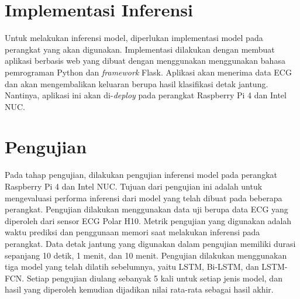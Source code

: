 \section{Implementasi Inferensi}
\label{subsec: metodologi-implementasi}

Untuk melakukan inferensi model, diperlukan implementasi model pada perangkat yang akan digunakan.
Implementasi dilakukan dengan membuat aplikasi berbasis web yang dibuat dengan menggunakan menggunakan bahasa pemrograman Python dan \textit{framework} Flask.
Aplikasi akan menerima data ECG dan akan mengembalikan keluaran berupa hasil klasifikasi detak jantung.
Nantinya, aplikasi ini akan di-\textit{deploy} pada perangkat Raspberry Pi 4 dan Intel NUC.



\section{Pengujian}
\label{subsec: metodologi-pengujian}


Pada tahap pengujian, dilakukan pengujian inferensi model pada perangkat Raspberry Pi 4 dan Intel NUC.
Tujuan dari pengujian ini adalah untuk mengevaluasi performa inferensi dari model yang telah dibuat pada beberapa perangkat.
Pengujian dilakukan menggunakan data uji berupa data ECG yang diperoleh dari sensor ECG Polar H10.
Metrik pengujian yang digunakan adalah waktu prediksi dan penggunaan memori saat melakukan inferensi pada perangkat.
Data detak jantung yang digunakan dalam pengujian memiliki durasi sepanjang 10 detik, 1 menit, dan 10 menit.
Pengujian dilakukan menggunakan tiga model yang telah dilatih sebelumnya, yaitu LSTM, Bi-LSTM, dan LSTM-FCN.
Setiap pengujian diulang sebanyak 5 kali untuk setiap jenis model, dan hasil yang diperoleh kemudian dijadikan nilai rata-rata sebagai hasil akhir.

